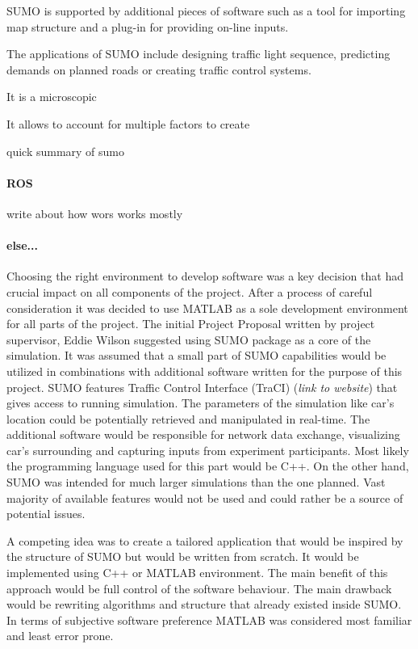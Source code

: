 \documentclass[11pt,english]{article}
\begin{document}
SUMO is supported by additional pieces of software such as a tool for importing map structure and a plug-in for providing on-line inputs.

The applications of SUMO include designing traffic light sequence, predicting demands on planned roads or creating traffic control systems.  


It is a microscopic

It allows to account for multiple factors to create 

quick summary of sumo

\paragraph{ROS}


write about how wors works mostly



\citet{parkin2016understanding}



\paragraph{else...}

Choosing the right environment to develop software was a key decision that had crucial impact on all components of the project. After a process of careful consideration it was decided to use MATLAB as a sole development environment for all parts of the project. The initial Project Proposal written by project supervisor, Eddie Wilson suggested using SUMO package as a core of the simulation. It was assumed that a small part of SUMO capabilities would be utilized in combinations with additional software written for the purpose of this project. SUMO features  Traffic Control Interface (TraCI) (\textit{link to website}) that gives access to running simulation. The parameters of the simulation like car's location could be potentially retrieved and manipulated in real-time. The additional software would be responsible for network data exchange, visualizing car's surrounding and capturing inputs from experiment participants. Most likely the programming language used for this part would be C++. On the other hand, SUMO was intended for much larger simulations than the one planned. Vast majority of available features would not be used and could rather be a source of potential issues. 

A competing idea was to create a tailored application that would be inspired by the structure of SUMO but would be written from scratch. It would be implemented using C++ or MATLAB environment. The main benefit of this approach would be full control of the software behaviour. The main drawback would be rewriting algorithms and structure that already existed inside SUMO. In terms of subjective software preference MATLAB was considered most familiar and least error prone.  
\end{document}
